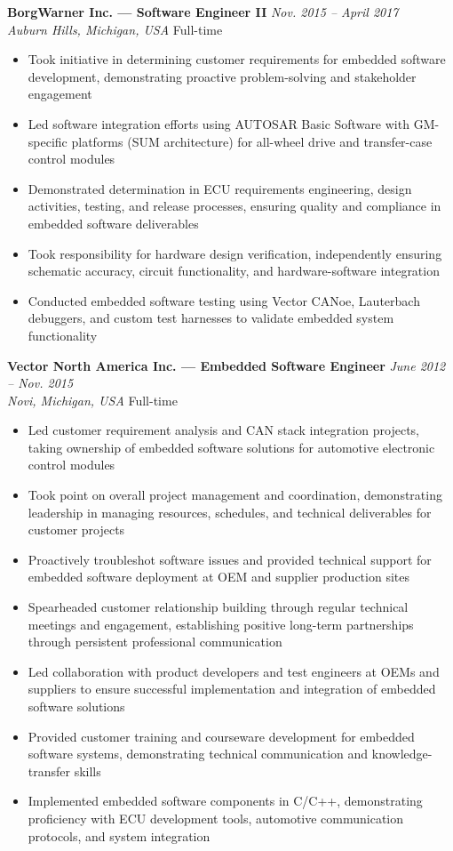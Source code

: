 \documentclass[11pt,letterpaper]{article}
\newcommand{\RoleHeading}[4]{%
  {\bfseries#1} \hfill {\itshape#2}\\
  {\itshape#3} \hfill #4
}
\newenvironment{jobenvironment}[4]{%
  \needspace{2cm}
  \vspace{0.15cm}
  \RoleHeading{#1}{#2}{#3}{#4}
  \vspace{0.05cm}
  \begin{itemize}[leftmargin=0.2in, itemsep=0.05cm, parsep=0cm]
}{%
  \end{itemize}
}
\begin{document}
\begin{jobenvironment}
  {BorgWarner Inc. — Software Engineer II}
  {Nov. 2015 -- April 2017}
  {Auburn Hills, Michigan, USA}
  {Full-time}

  \item Took initiative in determining customer requirements for embedded software development, demonstrating proactive problem-solving and stakeholder engagement
  \item Led software integration efforts using AUTOSAR Basic Software with GM-specific platforms (SUM architecture) for all-wheel drive and transfer-case control modules
  \item Demonstrated determination in ECU requirements engineering, design activities, testing, and release processes, ensuring quality and compliance in embedded software deliverables
  \item Took responsibility for hardware design verification, independently ensuring schematic accuracy, circuit functionality, and hardware-software integration
  \item Conducted embedded software testing using Vector CANoe, Lauterbach debuggers, and custom test harnesses to validate embedded system functionality
\end{jobenvironment}

\begin{jobenvironment}
  {Vector North America Inc. — Embedded Software Engineer}
  {June 2012 -- Nov. 2015}
  {Novi, Michigan, USA}
  {Full-time}

  \item Led customer requirement analysis and CAN stack integration projects, taking ownership of embedded software solutions for automotive electronic control modules
  \item Took point on overall project management and coordination, demonstrating leadership in managing resources, schedules, and technical deliverables for customer projects
  \item Proactively troubleshot software issues and provided technical support for embedded software deployment at OEM and supplier production sites
  \item Spearheaded customer relationship building through regular technical meetings and engagement, establishing positive long-term partnerships through persistent professional communication
  \item Led collaboration with product developers and test engineers at OEMs and suppliers to ensure successful implementation and integration of embedded software solutions
  \item Provided customer training and courseware development for embedded software systems, demonstrating technical communication and knowledge-transfer skills
  \item Implemented embedded software components in C/C++, demonstrating proficiency with ECU development tools, automotive communication protocols, and system integration
\end{jobenvironment}
\end{document}
